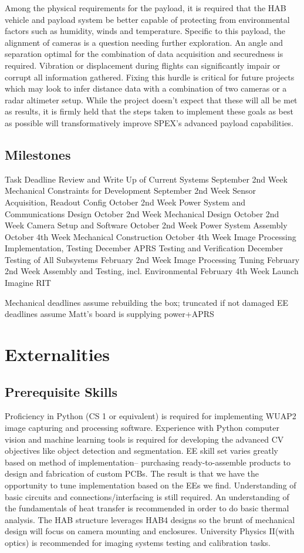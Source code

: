 \documentclass[conference]{IEEEtran} %
\begin{document}
Among the physical requirements for the payload, it is required that the HAB vehicle and payload system be better capable of protecting from environmental factors such as humidity, winds and temperature. Specific to this payload, the alignment of cameras is a question needing further exploration. An angle and separation optimal for the combination of data acquisition and securedness is required. Vibration or displacement during flights can significantly impair or corrupt all information gathered. Fixing this hurdle is critical for future projects which may look to infer distance data with a combination of two cameras or a radar altimeter setup. While the project doesn't expect that these will all be met as results, it is firmly held that the steps taken to implement these goals as best as possible will transformatively improve SPEX's advanced payload capabilities.

\subsection{Milestones}

Task
Deadline
Review and Write Up of Current Systems
September 2nd Week
Mechanical Constraints for Development
September 2nd Week
Sensor Acquisition, Readout Config
October 2nd Week
Power System and Communications Design
October 2nd Week
Mechanical Design
October 2nd Week
Camera Setup and Software
October 2nd Week
Power System Assembly
October 4th Week
Mechanical Construction
October 4th Week
Image Processing Implementation, Testing
December
APRS Testing and Verification
December
Testing of All Subsystems
February 2nd Week
Image Processing Tuning
February 2nd Week
Assembly and Testing, incl. Environmental
February 4th Week
Launch
Imagine RIT


Mechanical deadlines assume rebuilding the box; truncated if not damaged
EE deadlines assume Matt's board is supplying power+APRS

\section{Externalities}
\subsection{Prerequisite Skills}
Proficiency in Python (CS 1 or equivalent) is required for implementing WUAP2 image capturing and processing software.  Experience with Python computer vision and machine learning tools is required for developing the advanced CV objectives like object detection and segmentation. EE skill set varies greatly based on method of implementation-- purchasing ready-to-assemble products to design and fabrication of custom PCBs. The result is that we have the opportunity to tune implementation based on the EEs we find. Understanding of basic circuits and connections/interfacing is still required. An understanding of the fundamentals of heat transfer is recommended in order to do basic thermal analysis. The HAB structure leverages HAB4 designs so the brunt of mechanical design will focus on camera mounting and enclosures. University Physics II(with optics) is recommended for imaging systems testing and calibration tasks.
\end{document}
